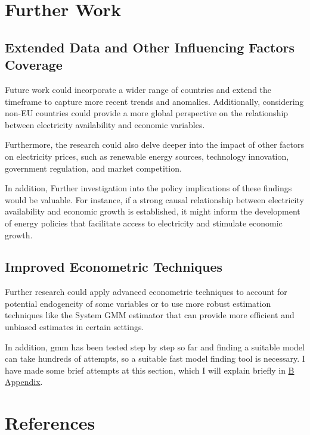 \documentclass[12pt]{article}
\begin{document}
\section{Further Work }
\subsection{Extended Data and Other Influencing Factors Coverage}
Future work could incorporate a wider range of countries and extend the timeframe to capture more recent trends and anomalies. Additionally, considering non-EU countries could provide a more global perspective on the relationship between electricity availability and economic variables.

Furthermore, the research could also delve deeper into the impact of other factors on electricity prices, such as renewable energy sources, technology innovation, government regulation, and market competition.

In addition, Further investigation into the policy implications of these findings would be valuable. For instance, if a strong causal relationship between electricity availability and economic growth is established, it might inform the development of energy policies that facilitate access to electricity and stimulate economic growth.

\subsection{Improved Econometric Techniques}
Further research could apply advanced econometric techniques to account for potential endogeneity of some variables or to use more robust estimation techniques like the System GMM estimator that can provide more efficient and unbiased estimates in certain settings.

In addition, gmm has been tested step by step so far and finding a suitable model can take hundreds of attempts, so a suitable fast model finding tool is necessary. I have made some brief attempts at this section, which I will explain briefly in \hyperlink{thesentence}{B Appendix}.



\newpage


\section{References}
\printbibliography

\newpage
{}
\appendix
\end{document}
